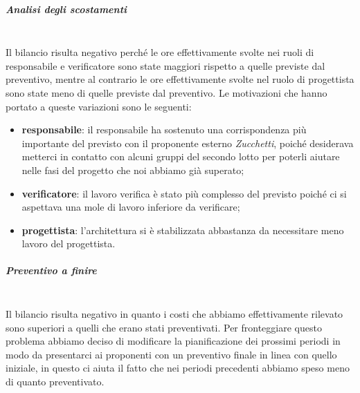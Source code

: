 \subparagraph*{Analisi degli scostamenti} \mbox{} \\
Il bilancio risulta negativo perché le ore effettivamente svolte nei ruoli di responsabile e verificatore sono state maggiori rispetto a quelle previste dal preventivo, mentre al contrario le ore effettivamente svolte nel ruolo di progettista sono state meno di quelle previste dal preventivo.
Le motivazioni che hanno portato a queste variazioni sono le seguenti:
\begin{itemize}
	\item \textbf{responsabile}: il responsabile ha sostenuto una corrispondenza più importante del previsto con il proponente esterno \textit{Zucchetti}, poiché desiderava metterci in contatto con alcuni gruppi del secondo lotto per poterli aiutare nelle fasi del progetto che noi abbiamo già superato;
	\item \textbf{verificatore}: il lavoro verifica è stato più complesso del previsto poiché ci si aspettava una mole di lavoro inferiore da verificare;
	\item \textbf{progettista}: l'architettura si è stabilizzata abbastanza da necessitare meno lavoro del progettista.
\end{itemize}
\subparagraph*{Preventivo a finire} \mbox{} \\
Il bilancio risulta negativo in quanto i costi che abbiamo effettivamente rilevato sono superiori a quelli che erano stati preventivati. Per fronteggiare questo problema abbiamo deciso di modificare la pianificazione dei prossimi periodi in modo da presentarci ai proponenti con un preventivo finale in linea con quello iniziale, in questo ci aiuta il fatto che nei periodi precedenti abbiamo speso meno di quanto preventivato.









































